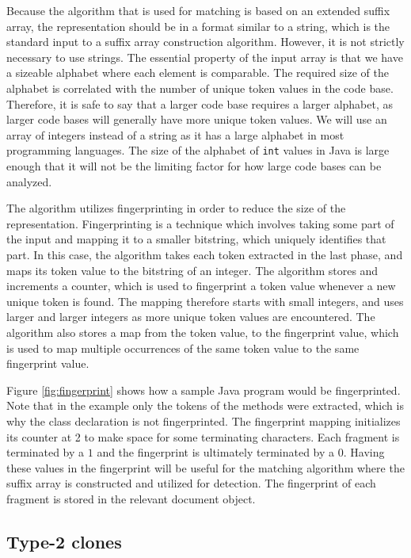 Because the algorithm that is used for matching is based on an extended suffix array, the
representation should be in a format similar to a string, which is the standard input to a
suffix array construction algorithm. However, it is not strictly necessary to use strings.
The essential property of the input array is that we have a sizeable alphabet where each
element is comparable. The required size of the alphabet is correlated with the number of
unique token values in the code base. Therefore, it is safe to say that a larger code base
requires a larger alphabet, as larger code bases will generally have more unique token
values. We will use an array of integers instead of a string as it has a large alphabet in
most programming languages. The size of the alphabet of \verb|int| values in Java is large
enough that it will not be the limiting factor for how large code bases can be analyzed.

The algorithm utilizes fingerprinting in order to reduce the size of the representation.
Fingerprinting is a technique which involves taking some part of the input and mapping it
to a smaller bitstring, which uniquely identifies that part. In this case, the algorithm
takes each token extracted in the last phase, and maps its token value to the bitstring of
an integer. The algorithm stores and increments a counter, which is used to fingerprint a
token value whenever a new unique token is found. The mapping therefore starts with small
integers, and uses larger and larger integers as more unique token values are encountered.
The algorithm also stores a map from the token value, to the fingerprint value, which is
used to map multiple occurrences of the same token value to the same fingerprint value.

Figure \ref{fig:fingerprint} shows how a sample Java program would be fingerprinted. Note
that in the example only the tokens of the methods were extracted, which is why the class
declaration is not fingerprinted. The fingerprint mapping initializes its counter at 2 to
make space for some terminating characters. Each fragment is terminated by a $1$ and the
fingerprint is ultimately terminated by a $0$. Having these values in the fingerprint will
be useful for the matching algorithm where the suffix array is constructed and utilized
for detection. The fingerprint of each fragment is stored in the relevant document object.

\subsection*{Type-2 clones}

